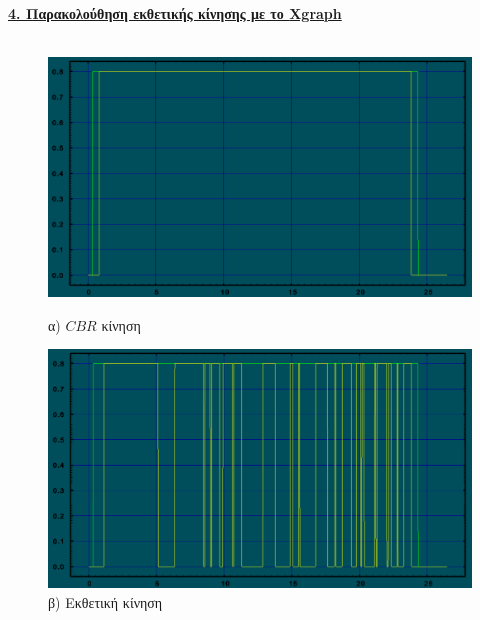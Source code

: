 \documentclass{article}%
\begin{document}
\textbf{{\underline{4. Παρακολούθηση εκθετικής κίνησης με το \textlatin{Xgraph}}}} \\\\

\begin{figure}[htbp]
\centering
\begin{minipage}{0.49\textwidth}
\centering
\includegraphics[width=1.00\textwidth]{9.png}
\caption{α) $CBR$ κίνηση}
\end{minipage}\hfill
\begin{minipage}{0.49\textwidth}
\centering
\includegraphics[width=1.00\textwidth]{10.png}
\caption{β) Εκθετική κίνηση}
\end{minipage}
\end{figure}
\end{document}
